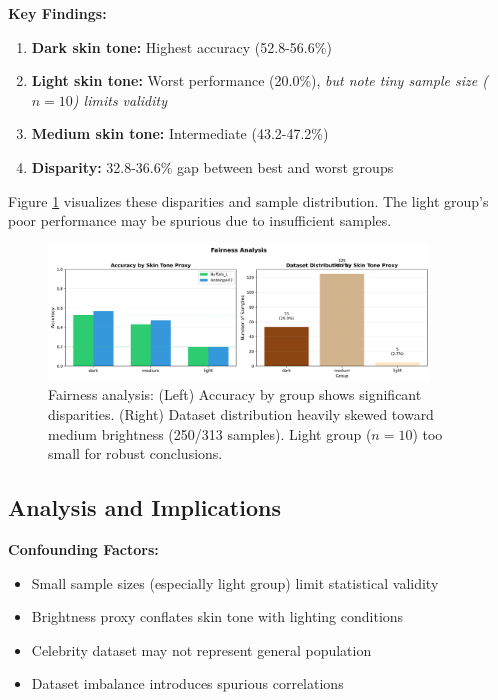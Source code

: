 \documentclass[11pt,a4paper]{article}
\begin{document}
\textbf{Key Findings:}
\begin{enumerate}
    \item \textbf{Dark skin tone:} Highest accuracy (52.8-56.6\%)
    \item \textbf{Light skin tone:} Worst performance (20.0\%), \textit{but note tiny sample size ($n=10$) limits validity}
    \item \textbf{Medium skin tone:} Intermediate (43.2-47.2\%)
    \item \textbf{Disparity:} 32.8-36.6\% gap between best and worst groups
\end{enumerate}

Figure \ref{fig:fairness} visualizes these disparities and sample distribution. The light group's poor performance may be spurious due to insufficient samples.

\begin{figure}[H]
    \centering
    \includegraphics[width=0.9\textwidth]{runs/fairness_analysis.png}
    \caption{Fairness analysis: (Left) Accuracy by group shows significant disparities. (Right) Dataset distribution heavily skewed toward medium brightness (250/313 samples). Light group ($n=10$) too small for robust conclusions.}
    \label{fig:fairness}
\end{figure}

\subsection{Analysis and Implications}

\textbf{Confounding Factors:}
\begin{itemize}
    \item Small sample sizes (especially light group) limit statistical validity
    \item Brightness proxy conflates skin tone with lighting conditions
    \item Celebrity dataset may not represent general population
    \item Dataset imbalance introduces spurious correlations
\end{itemize}
\end{document}
